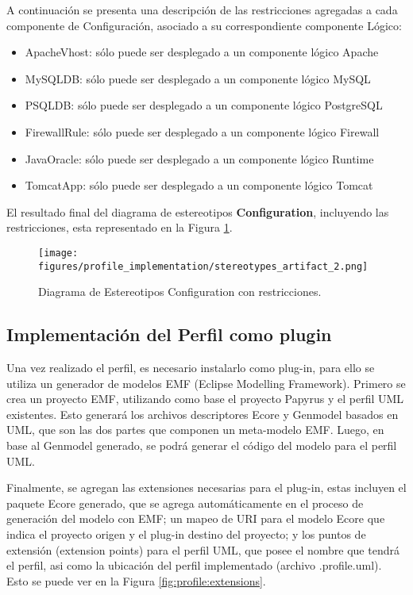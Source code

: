A continuación se presenta una descripción de las restricciones agregadas a cada componente de Configuración, asociado a su correspondiente componente Lógico:

\begin{itemize}
    \item ApacheVhost: sólo puede ser desplegado a un componente lógico Apache
    \item MySQLDB: sólo puede ser desplegado a un componente lógico MySQL
    \item PSQLDB: sólo puede ser desplegado a un componente lógico PostgreSQL
    \item FirewallRule: sólo puede ser desplegado a un componente lógico Firewall
    \item JavaOracle: sólo puede ser desplegado a un componente lógico Runtime
    \item TomcatApp: sólo puede ser desplegado a un componente lógico Tomcat
\end{itemize}

El resultado final del diagrama de estereotipos \textbf{Configuration}, incluyendo las restricciones, esta representado en la Figura \ref{fig:profile:artifact_final}.

\begin{figure}[htbp]
    \centering
    \texttt{[image: figures/profile\_implementation/stereotypes\_artifact\_2.png]}
    \caption{Diagrama de Estereotipos Configuration con restricciones.}
    \label{fig:profile:artifact_final}
\end{figure}

\subsection{Implementación del Perfil como plugin}

Una vez realizado el perfil, es necesario instalarlo como plug-in, para ello se utiliza un generador de modelos EMF (Eclipse Modelling Framework). Primero se crea un proyecto EMF, utilizando como base el proyecto Papyrus y el perfil UML existentes. Esto generará los archivos descriptores Ecore y Genmodel basados en UML, que son las dos partes que componen un meta-modelo EMF. Luego, en base al Genmodel generado, se podrá generar el código del modelo para el perfil UML.

Finalmente, se agregan las extensiones necesarias para el plug-in, estas incluyen el paquete Ecore generado, que se agrega automáticamente en el proceso de generación del modelo con EMF; un mapeo de URI para el modelo Ecore que indica el proyecto origen y el plug-in destino del proyecto; y los puntos de extensión (extension points) para el perfil UML, que posee el nombre que tendrá el perfil, asi como la ubicación del perfil implementado (archivo .profile.uml). Esto se puede ver en la Figura \ref{fig:profile:extensions}.

